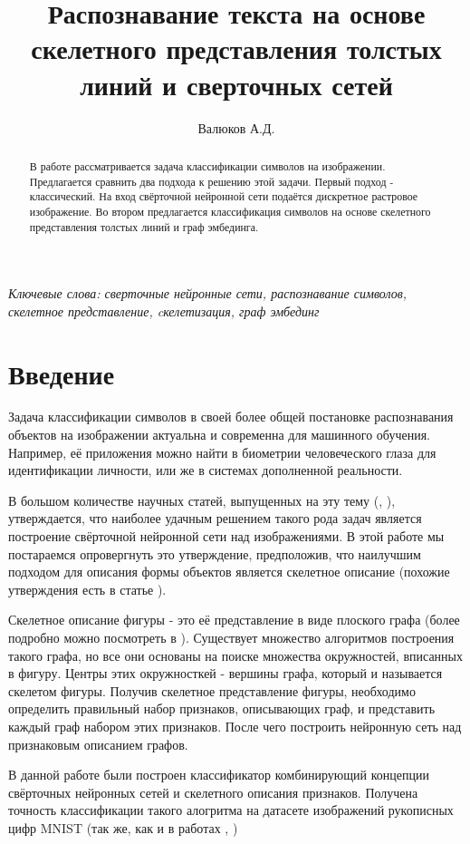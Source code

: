 \documentclass{llncs}
\title{Распознавание текста на основе скелетного представления толстых линий и сверточных сетей }
\author{Валюков А.Д.}
\institute{Московский физико-технический институт (Государственный университет) \\ \email{valukov.alex@gmail.com}}
\begin{document}
\maketitle

\begin{abstract}
В работе рассматривается задача классификации символов на изображении. Предлагается сравнить два подхода к решению этой задачи. 
Первый подход - классический. На вход свёрточной нейронной сети подаётся дискретное растровое изображение. 
Во втором предлагается классификация символов на основе скелетного представления толстых линий и граф эмбединга.
\end{abstract}

\textit{Ключевые слова: сверточные нейронные сети, распознавание символов, скелетное представление, cкелетизация, граф эмбединг}

\section{Введение}

Задача классификации символов в своей более общей постановке распознавания объектов на изображении актуальна и современна для машинного обучения. Например, её приложения можно найти в биометрии человеческого глаза для идентификации личности, или же в системах дополненной реальности.

В большом количестве научных статей, выпущенных на эту тему (\cite{Simard2003}, \cite{Ciresan2011}), утверждается, что наиболее удачным решением такого рода задач является построение свёрточной нейронной сети над изображениями. В этой работе мы постараемся опровергнуть это утверждение, предположив, что наилучшим подходом для описания формы объектов является скелетное описание (похожие утверждения есть в статье \cite{Kushni2012}).

Скелетное описание фигуры - это её представление в виде плоского графа (более подробно можно посмотреть в \cite{Mestetskiy2009}). Существует множество алгоритмов построения такого графа, но все они основаны на поиске множества окружностей, вписанных в фигуру. Центры этих окружносткей - вершины графа, который и называется скелетом фигуры. Получив скелетное представление фигуры, необходимо определить правильный набор признаков, описывающих граф, и представить каждый граф набором этих признаков. После чего построить нейронную сеть над признаковым описанием графов.

В данной работе были построен классификатор комбинирующий концепции свёрточных нейронных сетей и скелетного описания признаков. Получена точность классификации такого алогритма на датасете изображений рукописных цифр MNIST (так же, как и в работах \cite{Nair2018}, \cite{Hseih2018})
\end{document}

